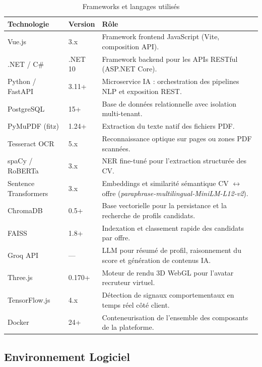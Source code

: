 \begin{table}[h]
\centering
\renewcommand{\arraystretch}{1.5}
\begin{tabular}{|p{3cm}|p{3cm}|p{7cm}|}
\hline
\textbf{Technologie} & \textbf{Version} & \textbf{Rôle} \\
\hline
Vue.js & 3.x & Framework frontend JavaScript (Vite, composition API). \\
\hline
.NET / C\# & .NET 10 & Framework backend pour les APIs RESTful (ASP.NET Core). \\
\hline
Python / FastAPI & 3.11+ & Microservice IA : orchestration des pipelines NLP et exposition REST. \\
\hline
PostgreSQL & 15+ & Base de données relationnelle avec isolation multi-tenant. \\
\hline
PyMuPDF (fitz) & 1.24+ & Extraction du texte natif des fichiers PDF. \\
\hline
Tesseract OCR & 5.x & Reconnaissance optique sur pages ou zones PDF scannées. \\
\hline
spaCy / RoBERTa & 3.x & NER fine-tuné pour l'extraction structurée des CV. \\
\hline
Sentence Transformers & 3.x & Embeddings et similarité sémantique CV $\leftrightarrow$ offre
(\textit{paraphrase-multilingual-MiniLM-L12-v2}). \\
\hline
ChromaDB & 0.5+ & Base vectorielle pour la persistance et la recherche de profils candidats. \\
\hline
FAISS & 1.8+ & Indexation et classement rapide des candidats par offre. \\
\hline
Groq API & --- & LLM pour résumé de profil, raisonnement du score et génération de contenus IA. \\
\hline
Three.js & 0.170+ & Moteur de rendu 3D WebGL pour l'avatar recruteur virtuel. \\
\hline
TensorFlow.js & 4.x & Détection de signaux comportementaux en temps réel côté client. \\
\hline
Docker & 24+ & Conteneurisation de l'ensemble des composants de la plateforme. \\
\hline
\end{tabular}
\caption{Frameworks et langages utilisés}
\label{tab:frameworks}
\end{table}

\subsection{Environnement Logiciel}


